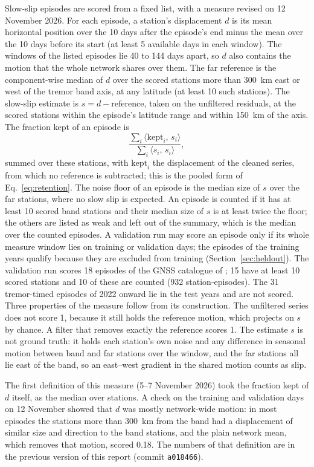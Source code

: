 \documentclass[preprint,12pt,authoryear]{elsarticle}
\begin{document}
Slow-slip episodes are scored from a fixed list, with a measure revised on 12 November 2026. For each episode, a station's displacement $d$ is its mean horizontal position over the 10 days after the episode's end minus the mean over the 10 days before its start (at least 5 available days in each window). The windows of the listed episodes lie 40 to 144 days apart, so $d$ also contains the motion that the whole network shares over them. The far reference is the component-wise median of $d$ over the scored stations more than 300~km east or west of the tremor band axis, at any latitude (at least 10 such stations). The slow-slip estimate is $s = d - \text{reference}$, taken on the unfiltered residuals, at the scored stations within the episode's latitude range and within 150~km of the axis. The fraction kept of an episode is
\begin{equation}
  \frac{\sum_i \langle \text{kept}_i,\, s_i \rangle}{\sum_i \langle s_i,\, s_i \rangle},
  \label{eq:episodes}
\end{equation}
summed over these stations, with $\text{kept}_i$ the displacement of the cleaned series, from which no reference is subtracted; this is the pooled form of Eq.~\eqref{eq:retention}. The noise floor of an episode is the median size of $s$ over the far stations, where no slow slip is expected. An episode is counted if it has at least 10 scored band stations and their median size of $s$ is at least twice the floor; the others are listed as weak and left out of the summary, which is the median over the counted episodes. A validation run may score an episode only if its whole measure window lies on training or validation days; the episodes of the training years qualify because they are excluded from training (Section~\ref{sec:heldout}). The validation run scores 18 episodes of the GNSS catalogue of \citet{michel2019}; 15 have at least 10 scored stations and 10 of these are counted (932 station-episodes). The 31 tremor-timed episodes of 2022 onward lie in the test years and are not scored. Three properties of the measure follow from its construction. The unfiltered series does not score 1, because it still holds the reference motion, which projects on $s$ by chance. A filter that removes exactly the reference scores 1. The estimate $s$ is not ground truth: it holds each station's own noise and any difference in seasonal motion between band and far stations over the window, and the far stations all lie east of the band, so an east--west gradient in the shared motion counts as slip.

The first definition of this measure (5--7 November 2026) took the fraction kept of $d$ itself, as the median over stations. A check on the training and validation days on 12 November showed that $d$ was mostly network-wide motion: in most episodes the stations more than 300~km from the band had a displacement of similar size and direction to the band stations, and the plain network mean, which removes that motion, scored 0.18. The numbers of that definition are in the previous version of this report (commit \texttt{a018466}).
\end{document}
